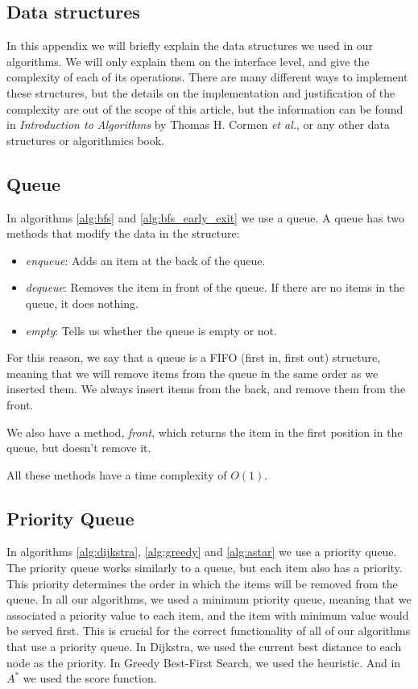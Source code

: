 \documentclass[12pt]{report}
\begin{document}
\begin{appendices}

\chapter{Data structures}

In this appendix we will briefly explain the data structures we used in our algorithms. We will only explain them on the interface level, and give the complexity of each of its operations. There are many different ways to implement these structures, but the details on the implementation and justification of the complexity are out of the scope of this article, but the information can be found in \emph{Introduction to Algorithms} by Thomas H. Cormen \textit{et al.}, or any other data structures or algorithmics book.

\section{Queue}
\label{annex:queue}
In algorithms \ref{alg:bfs} and \ref{alg:bfs_early_exit} we use a queue. A queue has two methods that modify the data in the structure:
\begin{itemize}
\item \emph{enqueue}: Adds an item at the back of the queue.
\item \emph{dequeue}: Removes the item in front of the queue. If there are no items in the queue, it does nothing.
\item \emph{empty}: Tells us whether the queue is empty or not.
\end{itemize}
For this reason, we say that a queue is a FIFO (first in, first out) structure, meaning that we will remove items from the queue in the same order as we inserted them. We always insert items from the back, and remove them from the front.

We also have a method, \emph{front}, which returns the item in the first position in the queue, but doesn't remove it.

All these methods have a time complexity of $O(1)$.

\section{Priority Queue}
\label{annex:priorityqueue}
In algorithms \ref{alg:dijkstra}, \ref{alg:greedy} and \ref{alg:astar} we use a priority queue. The priority queue works similarly to a queue, but each item also has a priority. This priority determines the order in which the items will be removed from the queue. In all our algorithms, we used a minimum priority queue, meaning that we associated a priority value to each item, and the item with minimum value would be served first. This is crucial for the correct functionality of all of our algorithms that use a priority queue. In Dijkstra, we used the current best distance to each node as the priority. In Greedy Best-First Search, we used the heuristic. And in $A^*$ we used the score function.


\end{appendices}
\end{document}
